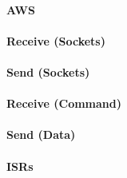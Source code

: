 \paragraph{AWS}
\paragraph{Receive (Sockets)}
\paragraph{Send (Sockets)}
\paragraph{Receive (Command)}
\paragraph{Send (Data)}
\paragraph{ISRs} %
